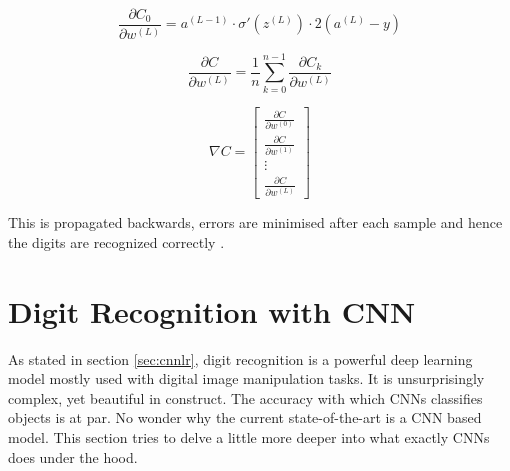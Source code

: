 \documentclass[12pt, a4paper]{report}
\begin{document}
\begin{equation}
    \label{equ:5.5}
    \frac{\partial C_0}{\partial w^{(L)}} = a^{(L-1)} \cdot \sigma'(z^{(L)}) \cdot 2(a^{(L)} - y)
\end{equation}

\begin{equation}
    \label{equ:5.6}
    \frac{\partial C}{\partial w^{(L)}} = \frac{1}{n} \sum_{k = 0}^{n - 1} \frac{\partial C_k}{\partial w^{(L)}}
\end{equation}

\begin{equation}
    \label{equ:5.7}
    \nabla C = \begin{bmatrix}
        \frac{\partial C}{\partial w^{(0)}} \\[1em]
        \frac{\partial C}{\partial w^{(1)}} \\[1em]
        \vdots                              \\[1em]
        \frac{\partial C}{\partial w^{(L)}}
    \end{bmatrix}
\end{equation}

This is propagated backwards, errors are minimised after each sample and hence the digits are recognized correctly \cite{yt:3b1b:nnp1}.

\section{Digit Recognition with CNN}
\label{sec:cnn}

\hspace{0.5cm} As stated in section \eqref{sec:cnnlr}, digit recognition is a powerful deep learning model mostly used with digital image manipulation tasks. It is unsurprisingly complex, yet beautiful in construct. The accuracy with which CNNs classifies objects is at par. No wonder why the current state-of-the-art is a CNN based model. This section tries to delve a little more deeper into what exactly CNNs does under the hood.
\end{document}
